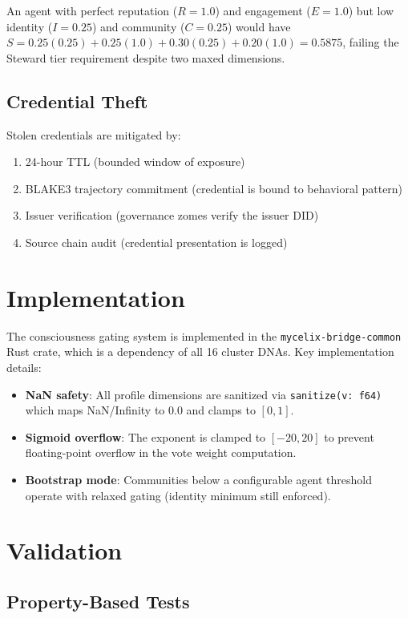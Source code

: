 \documentclass[11pt,twocolumn]{article}
\begin{document}
An agent with perfect reputation ($R = 1.0$) and engagement ($E = 1.0$)
but low identity ($I = 0.25$) and community ($C = 0.25$) would have
$S = 0.25(0.25) + 0.25(1.0) + 0.30(0.25) + 0.20(1.0) = 0.5875$,
failing the Steward tier requirement despite two maxed dimensions.

\subsection{Credential Theft}

Stolen credentials are mitigated by:
\begin{enumerate}[nosep]
  \item 24-hour TTL (bounded window of exposure)
  \item BLAKE3 trajectory commitment (credential is bound to behavioral pattern)
  \item Issuer verification (governance zomes verify the issuer DID)
  \item Source chain audit (credential presentation is logged)
\end{enumerate}

\section{Implementation}

The consciousness gating system is implemented in the \texttt{mycelix-bridge-common}
Rust crate, which is a dependency of all 16 cluster DNAs. Key implementation
details:

\begin{itemize}[nosep]
  \item \textbf{NaN safety}: All profile dimensions are sanitized via
    \texttt{sanitize(v: f64)} which maps NaN/Infinity to 0.0 and clamps
    to $[0, 1]$.
  \item \textbf{Sigmoid overflow}: The exponent is clamped to $[-20, 20]$
    to prevent floating-point overflow in the vote weight computation.
  \item \textbf{Bootstrap mode}: Communities below a configurable agent
    threshold operate with relaxed gating (identity minimum still enforced).
\end{itemize}

\section{Validation}

\subsection{Property-Based Tests}
\end{document}
